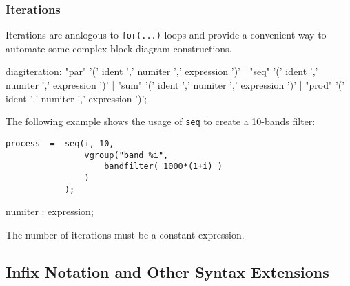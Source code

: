 

\subsubsection{Iterations} 
Iterations are analogous to \lstinline'for(...)' loops and provide a convenient way to automate some complex block-diagram constructions. 


\begin{rail}
diagiteration: "par" '(' ident ',' numiter ',' expression ')'
           | "seq" '(' ident ',' numiter ',' expression ')'
           | "sum" '(' ident ',' numiter ',' expression ')'
           | "prod" '(' ident ',' numiter ',' expression ')';
\end{rail}

The following example shows the usage of  \lstinline'seq' to create a 10-bands filter:

\begin{lstlisting}
process  =	seq(i, 10, 
				vgroup("band %i", 
					bandfilter( 1000*(1+i) ) 
				) 
			);
\end{lstlisting}

\begin{rail}
numiter : expression;
\end{rail}
The number of iterations must be a constant expression. 

\subsection{Infix Notation and Other Syntax Extensions}

